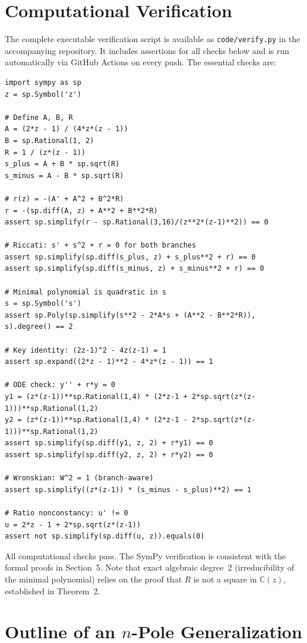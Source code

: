 \documentclass[11pt,a4paper]{article}
\theoremstyle{definition}
\begin{document}
\section{Computational Verification}

The complete executable verification script is available as \texttt{code/verify.py} in the accompanying repository. It includes assertions for all checks below and is run automatically via GitHub Actions on every push. The essential checks are:

\begin{lstlisting}[caption={SymPy Verification (excerpt)}]
import sympy as sp
z = sp.Symbol('z')

# Define A, B, R
A = (2*z - 1) / (4*z*(z - 1))
B = sp.Rational(1, 2)
R = 1 / (z*(z - 1))
s_plus = A + B * sp.sqrt(R)
s_minus = A - B * sp.sqrt(R)

# r(z) = -(A' + A^2 + B^2*R)
r = -(sp.diff(A, z) + A**2 + B**2*R)
assert sp.simplify(r - sp.Rational(3,16)/(z**2*(z-1)**2)) == 0

# Riccati: s' + s^2 + r = 0 for both branches
assert sp.simplify(sp.diff(s_plus, z) + s_plus**2 + r) == 0
assert sp.simplify(sp.diff(s_minus, z) + s_minus**2 + r) == 0

# Minimal polynomial is quadratic in s
s = sp.Symbol('s')
assert sp.Poly(sp.simplify(s**2 - 2*A*s + (A**2 - B**2*R)), s).degree() == 2

# Key identity: (2z-1)^2 - 4z(z-1) = 1
assert sp.expand((2*z - 1)**2 - 4*z*(z - 1)) == 1

# ODE check: y'' + r*y = 0
y1 = (z*(z-1))**sp.Rational(1,4) * (2*z-1 + 2*sp.sqrt(z*(z-1)))**sp.Rational(1,2)
y2 = (z*(z-1))**sp.Rational(1,4) * (2*z-1 - 2*sp.sqrt(z*(z-1)))**sp.Rational(1,2)
assert sp.simplify(sp.diff(y1, z, 2) + r*y1) == 0
assert sp.simplify(sp.diff(y2, z, 2) + r*y2) == 0

# Wronskian: W^2 = 1 (branch-aware)
assert sp.simplify((z*(z-1)) * (s_minus - s_plus)**2) == 1

# Ratio nonconstancy: u' != 0
u = 2*z - 1 + 2*sp.sqrt(z*(z-1))
assert not sp.simplify(sp.diff(u, z)).equals(0)
\end{lstlisting}
All computational checks pass. The SymPy verification is consistent with the formal proofs in Section~5. Note that exact algebraic degree~2 (irreducibility of the minimal polynomial) relies on the proof that \(R\) is not a square in \(\mathbb{C}(z)\), established in Theorem~2.

\section{Outline of an \(n\)-Pole Generalization}
\end{document}
